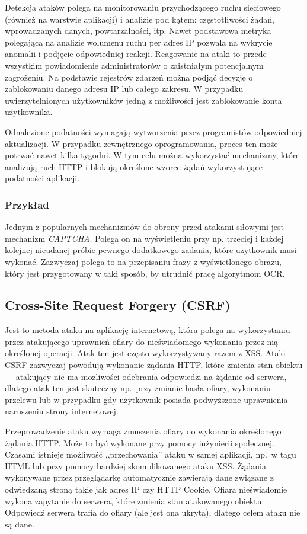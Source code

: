 \documentclass[11pt,a4paper,polish,thesis,oneside]{dcsbook}
\begin{document}
Detekcja ataków polega na monitorowaniu przychodzącego ruchu sieciowego (również na warstwie aplikacji) i analizie pod kątem: częstotliwości żądań, wprowadzanych danych, powtarzalności, itp. Nawet podstawowa metryka polegająca na analizie wolumenu ruchu per adres IP pozwala na wykrycie anomalii i podjęcie odpowiedniej reakcji. Reagowanie na ataki to przede wszystkim powiadomienie administratorów o zaistniałym potencjalnym zagrożeniu. Na podstawie rejestrów zdarzeń można podjąć decyzję o zablokowaniu danego adresu IP lub całego zakresu. W przypadku uwierzytelnionych użytkowników jedną z możliwości jest zablokowanie konta użytkownika.

Odnalezione podatności wymagają wytworzenia przez programistów odpowiedniej aktualizacji. W przypadku zewnętrznego oprogramowania, proces ten może potrwać nawet kilka tygodni. W tym celu można wykorzystać mechanizmy, które analizują ruch HTTP i blokują określone wzorce żądań wykorzystujące podatności aplikacji.

\subsubsection*{Przykład}
Jednym z popularnych mechanizmów do obrony przed atakami siłowymi jest mechanizm \textit{CAPTCHA}. Polega on na wyświetleniu przy np. trzeciej i każdej kolejnej nieudanej próbie pewnego dodatkowego zadania, które użytkownik musi wykonać. Zazwyczaj polega to na przepisaniu frazy z wyświetlonego obrazu, który jest przygotowany w taki sposób, by utrudnić pracę algorytmom OCR. 


\subsection{Cross-Site Request Forgery (CSRF)}
Jest to metoda ataku na aplikację internetową, która polega na wykorzystaniu przez atakującego uprawnień ofiary do nieświadomego wykonania przez nią określonej operacji. Atak ten jest często wykorzystywany razem z XSS.
Ataki CSRF zazwyczaj powodują wykonanie żądania HTTP, które zmienia stan obiektu --- atakujący nie ma możliwości odebrania odpowiedzi na żądanie od serwera, dlatego atak ten jest skuteczny np.~przy zmianie hasła ofiary, wykonaniu przelewu lub w przypadku gdy użytkownik posiada podwyższone uprawnienia --- naruszeniu strony internetowej.

Przeprowadzenie ataku wymaga zmuszenia ofiary do wykonania określonego żądania HTTP. Może to być wykonane przy pomocy inżynierii społecznej. Czasami istnieje możliwość ,,przechowania'' ataku w samej aplikacji, np.~w tagu HTML lub przy pomocy bardziej skomplikowanego ataku XSS. Żądania wykonywane przez przeglądarkę automatycznie zawierają dane związane z odwiedzaną stroną takie jak adres IP czy HTTP Cookie. Ofiara nieświadomie wykona zapytanie do serwera, które zmienia stan atakowanego obiektu. Odpowiedź serwera trafia do ofiary (ale jest ona ukryta), dlatego celem ataku nie są dane.
\end{document}
